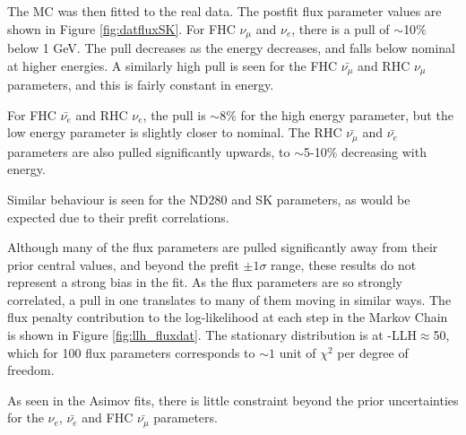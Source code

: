 The MC was then fitted to the real data. The postfit flux parameter values are shown in Figure \ref{fig:datfluxSK}. For FHC $\nu_{\mu}$ and $\nu_e$, there is a pull of $\sim$10$\%$ below 1 GeV. The pull decreases as the energy decreases, and falls below nominal at higher energies. A similarly high pull is seen for the FHC $\bar{\nu_{\mu}}$ and RHC $\nu_{\mu}$ parameters, and this is fairly constant in energy.

For FHC $\bar{\nu_e}$ and RHC $\nu_e$, the pull is $\sim8\%$ for the high energy parameter, but the low energy parameter is slightly closer to nominal. The RHC $\bar{\nu_{\mu}}$ and $\bar{\nu_e}$ parameters are also pulled significantly upwards, to $\sim$5-10$\%$ decreasing with energy.

Similar behaviour is seen for the ND280 and SK parameters, as would be expected due to their prefit correlations.

Although many of the flux parameters are pulled significantly away from their prior central values, and beyond the prefit $\pm1\sigma$ range, these results do not represent a strong bias in the fit. As the flux parameters are so strongly correlated, a pull in one translates to many of them moving in similar ways. The flux penalty contribution to the log-likelihood at each step in the Markov Chain is shown in Figure \ref{fig:llh_fluxdat}. The stationary distribution is at -LLH$\approx$50, which for 100 flux parameters corresponds to $\sim1$ unit of $\chi^2$ per degree of freedom.

As seen in the Asimov fits, there is little constraint beyond the prior uncertainties for the $\nu_e$, $\bar{\nu_e}$ and FHC $\bar{\nu_{\mu}}$ parameters.


